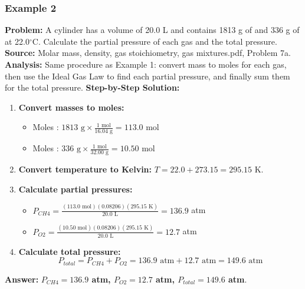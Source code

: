 \documentclass{article}
\begin{document}
\subsubsection{Example 2}
\textbf{Problem:} A cylinder has a volume of 20.0 L and contains 1813 g of  and 336 g of  at 22.0$^\circ$C. Calculate the partial pressure of each gas and the total pressure.
\textbf{Source:} Molar mass, density, gas stoichiometry, gas mixtures.pdf, Problem 7a.
\textbf{Analysis:} Same procedure as Example 1: convert mass to moles for each gas, then use the Ideal Gas Law to find each partial pressure, and finally sum them for the total pressure.
\textbf{Step-by-Step Solution:}
\begin{enumerate}
    \item \textbf{Convert masses to moles:}
    \begin{itemize}
        \item Moles : $1813 \text{ g} \times \frac{1 \text{ mol}}{16.04 \text{ g}} = 113.0$ mol
        \item Moles : $336 \text{ g} \times \frac{1 \text{ mol}}{32.00 \text{ g}} = 10.50$ mol
    \end{itemize}
    \item \textbf{Convert temperature to Kelvin:} $T = 22.0 + 273.15 = 295.15$ K.
    \item \textbf{Calculate partial pressures:}
    \begin{itemize}
        \item $P_{CH4} = \frac{(113.0 \text{ mol})(0.08206)(295.15 \text{ K})}{20.0 \text{ L}} = 136.9$ atm
        \item $P_{O2} = \frac{(10.50 \text{ mol})(0.08206)(295.15 \text{ K})}{20.0 \text{ L}} = 12.7$ atm
    \end{itemize}
    \item \textbf{Calculate total pressure:}
    \[ P_{total} = P_{CH4} + P_{O2} = 136.9 \text{ atm} + 12.7 \text{ atm} = 149.6 \text{ atm} \]
\end{enumerate}
\textbf{Answer:} \textbf{$P_{CH4}=136.9$ atm, $P_{O2}=12.7$ atm, $P_{total}=149.6$ atm}.
\end{document}

